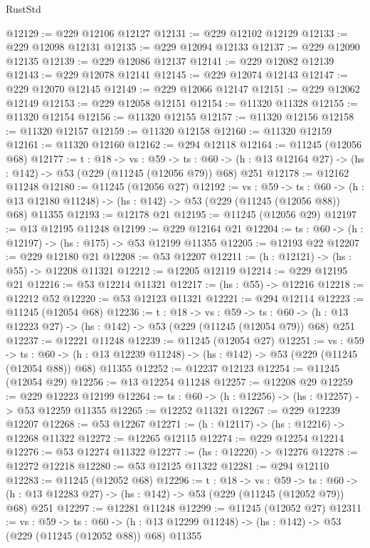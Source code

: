 \begin{lexlean}{RustStd}
\begin{coremodule}
@12129 := @229 @12106 @12127
@12131 := @229 @12102 @12129
@12133 := @229 @12098 @12131
@12135 := @229 @12094 @12133
@12137 := @229 @12090 @12135
@12139 := @229 @12086 @12137
@12141 := @229 @12082 @12139
@12143 := @229 @12078 @12141
@12145 := @229 @12074 @12143
@12147 := @229 @12070 @12145
@12149 := @229 @12066 @12147
@12151 := @229 @12062 @12149
@12153 := @229 @12058 @12151
@12154 := @11320 @11328
@12155 := @11320 @12154
@12156 := @11320 @12155
@12157 := @11320 @12156
@12158 := @11320 @12157
@12159 := @11320 @12158
@12160 := @11320 @12159
@12161 := @11320 @12160
@12162 := @294 @12118
@12164 := @11245 (@12056 @68)
@12177 := {t : @18} ->
  {vs : @59} ->
  {ts : @60} -> (h : @13 @12164 @27) -> (hs : @142) -> @53 (@229 (@11245 (@12056 @79)) @68) @251
@12178 := @12162 @11248
@12180 := @11245 (@12056 @27)
@12192 := {vs : @59} ->
  {ts : @60} ->
  (h : @13 @12180 @11248) -> (hs : @142) -> @53 (@229 (@11245 (@12056 @88)) @68) @11355
@12193 := @12178 @21
@12195 := @11245 (@12056 @29)
@12197 := @13 @12195 @11248
@12199 := @229 @12164 @21
@12204 := {ts : @60} -> (h : @12197) -> (hs : @175) -> @53 @12199 @11355
@12205 := @12193 @22
@12207 := @229 @12180 @21
@12208 := @53 @12207
@12211 := (h : @12121) -> (hs : @55) -> @12208 @11321
@12212 := @12205 @12119
@12214 := @229 @12195 @21
@12216 := @53 @12214 @11321
@12217 := (hs : @55) -> @12216
@12218 := @12212 @52
@12220 := @53 @12123 @11321
@12221 := @294 @12114
@12223 := @11245 (@12054 @68)
@12236 := {t : @18} ->
  {vs : @59} ->
  {ts : @60} -> (h : @13 @12223 @27) -> (hs : @142) -> @53 (@229 (@11245 (@12054 @79)) @68) @251
@12237 := @12221 @11248
@12239 := @11245 (@12054 @27)
@12251 := {vs : @59} ->
  {ts : @60} ->
  (h : @13 @12239 @11248) -> (hs : @142) -> @53 (@229 (@11245 (@12054 @88)) @68) @11355
@12252 := @12237 @12123
@12254 := @11245 (@12054 @29)
@12256 := @13 @12254 @11248
@12257 := @12208 @29
@12259 := @229 @12223 @12199
@12264 := {ts : @60} -> (h : @12256) -> (hs : @12257) -> @53 @12259 @11355
@12265 := @12252 @11321
@12267 := @229 @12239 @12207
@12268 := @53 @12267
@12271 := (h : @12117) -> (hs : @12216) -> @12268 @11322
@12272 := @12265 @12115
@12274 := @229 @12254 @12214
@12276 := @53 @12274 @11322
@12277 := (hs : @12220) -> @12276
@12278 := @12272 @12218
@12280 := @53 @12125 @11322
@12281 := @294 @12110
@12283 := @11245 (@12052 @68)
@12296 := {t : @18} ->
  {vs : @59} ->
  {ts : @60} -> (h : @13 @12283 @27) -> (hs : @142) -> @53 (@229 (@11245 (@12052 @79)) @68) @251
@12297 := @12281 @11248
@12299 := @11245 (@12052 @27)
@12311 := {vs : @59} ->
  {ts : @60} ->
  (h : @13 @12299 @11248) -> (hs : @142) -> @53 (@229 (@11245 (@12052 @88)) @68) @11355

\end{coremodule}
\end{lexlean}
